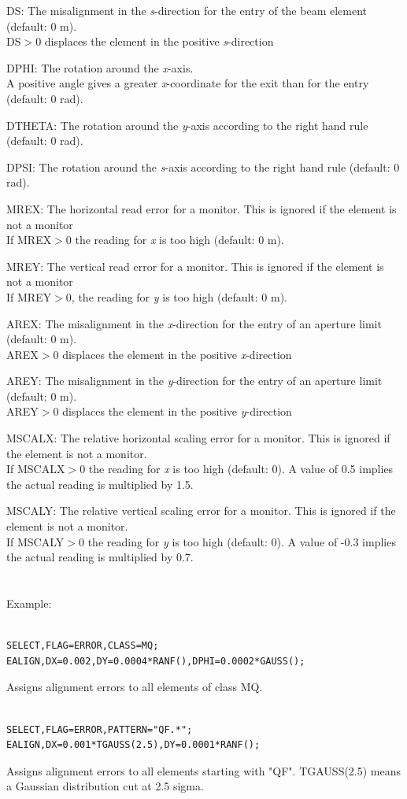 DS: The misalignment in the \textit{s}-direction for the entry of the beam element (default: 0 m). 
\\ DS$>$0 displaces the element in the positive \textit{s}-direction 

DPHI: The rotation around the \textit{x}-axis. 
\\ A positive angle gives a greater \textit{x}-coordinate for the exit than for the entry (default: 0 rad). 

DTHETA: The rotation around the \textit{y}-axis according to the right hand rule (default: 0 rad). 

DPSI: The rotation around the \textit{s}-axis according to the right hand rule (default: 0 rad). 

MREX: The horizontal read error for a monitor. This is ignored if the element is not a monitor 
\\ If MREX$>$0 the reading for \textit{x} is too high (default: 0 m). 

MREY: The vertical read error for a monitor. This is ignored if the element is not a monitor 
\\ If MREY$>$0, the reading for \textit{y} is too high (default: 0 m). 

AREX: The misalignment in the \textit{x}-direction for the entry of an aperture limit (default: 0 m). 
\\ AREX$>$0 displaces the element in the positive \textit{x}-direction 

AREY: The misalignment in the \textit{y}-direction for the entry of an aperture limit (default: 0 m). 
\\ AREY$>$0 displaces the element in the positive \textit{y}-direction 

MSCALX: The relative horizontal scaling error for a monitor. This is ignored if the element is not a monitor. 
\\ If MSCALX$>$0 the reading for \textit{x} is too high (default: 0). A value of 0.5 implies the actual reading is multiplied by 1.5. 

MSCALY: The relative vertical scaling error for a monitor. This is ignored if the element is not a monitor.  
\\ If MSCALY$>$0 the reading for \textit{y} is too high (default: 0). A value of -0.3 implies the actual reading is multiplied by 0.7. 
\\
\\
\\ Example: 
\begin{verbatim}

SELECT,FLAG=ERROR,CLASS=MQ;                  
EALIGN,DX=0.002,DY=0.0004*RANF(),DPHI=0.0002*GAUSS();
\end{verbatim} Assigns alignment errors to all elements of class MQ.           
\\
\begin{verbatim}

SELECT,FLAG=ERROR,PATTERN="QF.*";            
EALIGN,DX=0.001*TGAUSS(2.5),DY=0.0001*RANF();
\end{verbatim} Assigns alignment errors to all elements starting with "QF". TGAUSS(2.5) means a Gaussian distribution cut at 2.5 sigma. 
\\

